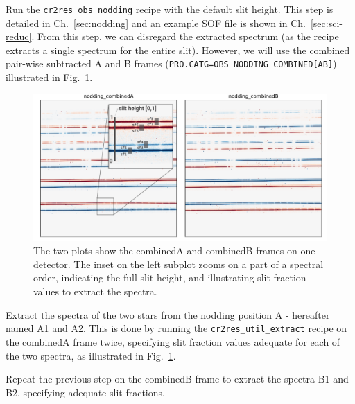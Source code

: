 Run the \verb!cr2res_obs_nodding! recipe with the default slit height.
This step is detailed in Ch.~\ref{sec:nodding} and an example SOF file is
shown in Ch.~\ref{sec:sci-reduc}.
From this step, we can disregard the extracted spectrum (as the recipe extracts
a single spectrum for the entire slit). However, we will use the combined
pair-wise subtracted A and B frames (\verb!PRO.CATG=OBS_NODDING_COMBINED[AB]!)
 illustrated in Fig.~\ref{fig:binary-nodding}.

\begin{shell}[fontsize=\small]
\end{shell}

\begin{figure}[!h]
  \begin{center}
    \includegraphics[width=1\textwidth]{figures/binary-nodding-combined}
  \end{center}
  \caption{
    \label{fig:binary-nodding}
    The two plots show the combinedA and combinedB frames
    on one detector. The inset on the left subplot zooms on a part of a
    spectral order, indicating the full slit height, 
    and illustrating slit fraction values to extract the spectra.}
\end{figure}

Extract the spectra of the two stars from the nodding position A -
hereafter named A1 and A2. This is done by running the \verb!cr2res_util_extract!
recipe on the combinedA frame twice, specifying slit fraction values adequate
for each of the two spectra, as illustrated in Fig.~\ref{fig:binary-nodding}.

Repeat the previous step on the combinedB frame to extract the spectra
B1 and B2, specifying adequate slit fractions.

\begin{shell}[fontsize=\small]
\end{shell}

